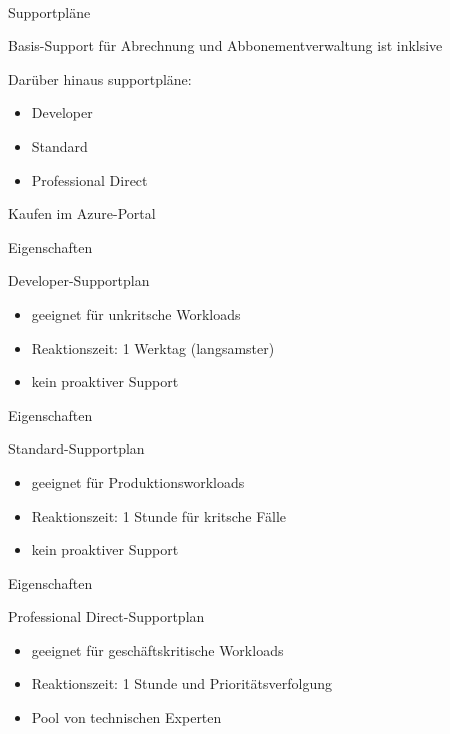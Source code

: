 \documentclass{scrartcl}
\newenvironment{flashcard}[2][]{%
    #1
    \vfill
    \centerline{\Large{#2}}
    \vfill
\newpage
}
{\newpage}
\begin{document}
    \begin{flashcard}[\ ]{Supportpläne}
        Basis-Support für Abrechnung und Abbonementverwaltung ist inklsive

        \vspace{5mm}
        Darüber hinaus supportpläne:
        \begin{itemize}
            \item Developer
            \item Standard
            \item Professional Direct
        \end{itemize}

        \vspace{5mm}
        Kaufen im Azure-Portal
    \end{flashcard}

    \begin{flashcard}[Eigenschaften]{Developer-Supportplan}
        \begin{itemize}
            \item geeignet für unkritsche Workloads
            \item Reaktionszeit: 1 Werktag (langsamster)
            \item kein proaktiver Support
        \end{itemize}
    \end{flashcard}

    \begin{flashcard}[Eigenschaften]{Standard-Supportplan}
        \begin{itemize}
            \item geeignet für Produktionsworkloads
            \item Reaktionszeit: 1 Stunde für kritsche Fälle
            \item kein proaktiver Support
        \end{itemize}
    \end{flashcard}

    \begin{flashcard}[Eigenschaften]{Professional Direct-Supportplan}
        \begin{itemize}
            \item geeignet für geschäftskritische Workloads
            \item Reaktionszeit: 1 Stunde und Prioritätsverfolgung
            \item Pool von technischen Experten
        \end{itemize}
    \end{flashcard}
\end{document}
